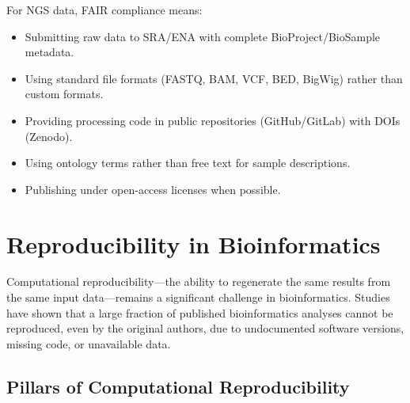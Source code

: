 For NGS data, FAIR compliance means:
\begin{itemize}[itemsep=2pt]
  \item Submitting raw data to SRA/ENA with complete BioProject/BioSample metadata.
  \item Using standard file formats (FASTQ, BAM, VCF, BED, BigWig) rather than custom formats.
  \item Providing processing code in public repositories (GitHub/GitLab) with DOIs (Zenodo).
  \item Using ontology terms rather than free text for sample descriptions.
  \item Publishing under open-access licenses when possible.
\end{itemize}

\section{Reproducibility in Bioinformatics}
\label{sec:datastandards:reproducibility}

Computational reproducibility---the ability to regenerate the same results from the same input data---remains a significant challenge in bioinformatics. Studies have shown that a large fraction of published bioinformatics analyses cannot be reproduced, even by the original authors, due to undocumented software versions, missing code, or unavailable data.

\subsection{Pillars of Computational Reproducibility}

